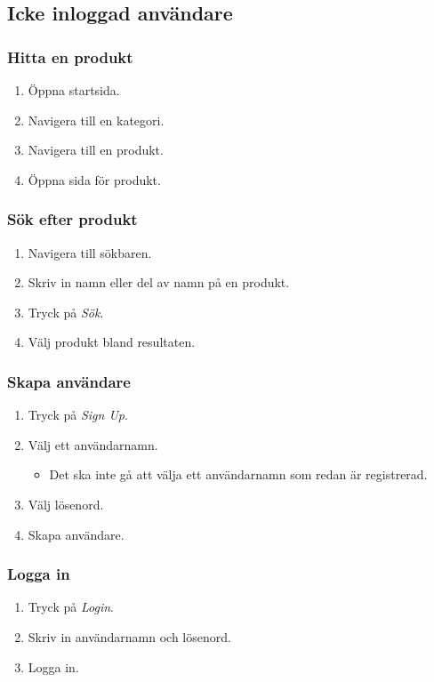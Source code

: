 \documentclass[a4paper]{article}
\begin{document}
\subsection{Icke inloggad användare}
\subsubsection{Hitta en produkt}
\begin{enumerate}
  \item Öppna startsida.
  \item Navigera till en kategori.
  \item Navigera till en produkt.
  \item Öppna sida för produkt.
\end{enumerate}
%
\subsubsection{Sök efter produkt}
\begin{enumerate}
  \item Navigera till sökbaren.
  \item Skriv in namn eller del av namn på en produkt.
  \item Tryck på \textit{Sök}.
  \item Välj produkt bland resultaten.
\end{enumerate}
%
\subsubsection{Skapa användare}
\begin{enumerate}
\item Tryck på \textit{Sign Up}.
\item Välj ett användarnamn.
\begin{itemize}
  \item Det ska inte gå att välja ett användarnamn som redan är registrerad.
\end{itemize}
\item Välj lösenord.
\item Skapa användare.
\end{enumerate}
%
\subsubsection{Logga in}
\begin{enumerate}
  \item Tryck på \textit{Login}.
  \item Skriv in användarnamn och lösenord.
  \item Logga in.
\end{enumerate}
%
\end{document}
